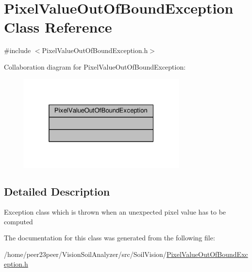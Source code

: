 \hypertarget{class_pixel_value_out_of_bound_exception}{}\section{Pixel\+Value\+Out\+Of\+Bound\+Exception Class Reference}
\label{class_pixel_value_out_of_bound_exception}


{\ttfamily \#include $<$Pixel\+Value\+Out\+Of\+Bound\+Exception.\+h$>$}



Collaboration diagram for Pixel\+Value\+Out\+Of\+Bound\+Exception\+:\nopagebreak
\begin{figure}[H]
\begin{center}
\leavevmode
\includegraphics[width=241pt]{class_pixel_value_out_of_bound_exception__coll__graph}
\end{center}
\end{figure}


\subsection{Detailed Description}
Exception class which is thrown when an unexpected pixel value has to be computed 

The documentation for this class was generated from the following file\+:\begin{DoxyCompactItemize}
\item 
/home/peer23peer/\+Vision\+Soil\+Analyzer/src/\+Soil\+Vision/\hyperlink{_pixel_value_out_of_bound_exception_8h}{Pixel\+Value\+Out\+Of\+Bound\+Exception.\+h}\end{DoxyCompactItemize}
